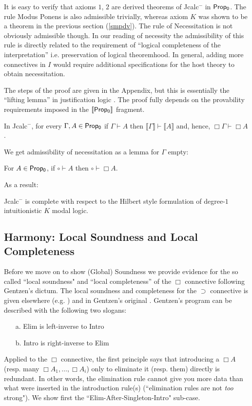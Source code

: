 	It is easy to verify that axioms $1$, $2$ are derived theorems of {\sf Jcalc$^{-}$} in ${\sf Prop_0}$. The rule Modus Ponens is also admissible trivially, whereas axiom $K$  was  
	shown to be a theorem in the previous section (\ref{smpdv}). The rule of Necessitation is not obviously admissible though. In our reading of necessity the
	admissibility of this rule is directly related to the requirement of ``logical completeness of the interpretation'' i.e. preservation of logical theoremhood.  
	In general, adding more connectives in $I$ would require additional specifications for the host theory to obtain necessitation.
	
	The steps of the proof are given in the Appendix, but this is essentially  the ``lifting lemma'' in justification logic \cite{Artemov2001}. 
	The proof fully depends on
	the provability requirements imposed in the $\llbracket{\sf Prop_0}\rrbracket$ fragment.
	\begin{theorem}
		In {\sf Jcalc$^{-}$}, for every  $\Gamma,   A \in {\sf Prop_0}$ if  $\Gamma\vdash A$ then  $\llbracket \Gamma\rrbracket\vdash\llbracket A\rrbracket $ and, hence, $\Box\Gamma \vdash \Box   A$.
	\end{theorem}
	We get admissibility of necessitation as a lemma for $\Gamma$ empty:
    \begin{theorem}
		
     For $  A \in {\sf Prop_0}$, if $\circ\vdash   A$ then $\circ\vdash \Box A$. 
	\end{theorem}
	As a result:
	\begin{theorem}[Completeness]
		{\sf Jcalc$^{-}$} is complete with respect to the Hilbert style formulation of degree-$1$ intuitionistic $K$ modal logic. 
	\end{theorem}
	
	\subsection{Harmony: Local Soundness and Local Completeness}
	\label{gprinc}
	Before we move on to show (Global) Soundness we provide evidence for the so called ``local soundness" and ``local completeness'' of the $\Box$ connective
	following Gentzen's dictum. The local soundness and completeness for the $\supset$ connective 
	is given elsewhere (e.g. \cite{prawitz10natural}) and in Gentzen's original \cite{gentzen1935untersuchungen}. Gentzen's program can be described with the following two slogans:\begin{itemize} \item[a.] Elim is left-inverse to Intro \item[b.] Intro is right-inverse to Elim\end{itemize}   
	Applied to the $\Box$ connective, the first principle says that introducing a $\Box   A$ (resp. many $\Box A_1, \ldots, \Box A_i$) only to eliminate it (resp. them) directly is redundant. 
	In other words, the elimination rule cannot give you more data than what were inserted in the introduction rule(s)  (``elimination rules are not \textit{too} strong").
	We show first the ``Elim-After-Singleton-Intro" sub-case.
	
